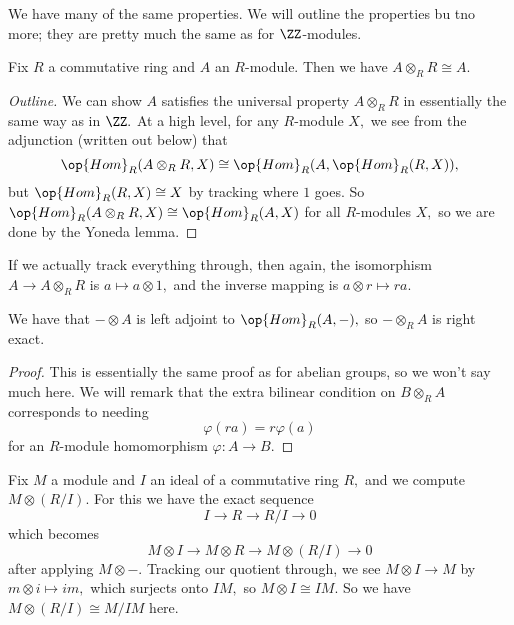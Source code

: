 \documentclass[../notes.tex]{subfiles}
\begin{document}
We have many of the same properties. We will outline the properties bu tno more; they are pretty much the same as for $\ZZ$-modules.
\begin{proposition}
	Fix $R$ a commutative ring and $A$ an $R$-module. Then we have $A\otimes_R R\cong A.$
\end{proposition}
\begin{proof}[Outline]
	We can show $A$ satisfies the universal property $A\otimes_RR$ in essentially the same way as in $\ZZ.$ At a high level, for any $R$-module $X,$ we see from the adjunction (written out below) that
	\[\op{Hom}_R(A\otimes_RR,X)\cong\op{Hom}_R(A,\op{Hom}_R(R,X)),\]
	but $\op{Hom}_R(R,X)\cong X$ by tracking where $1$ goes. So $\op{Hom}_R(A\otimes_RR,X)\cong\op{Hom}_R(A,X)$ for all $R$-modules $X,$ so we are done by the Yoneda lemma.
\end{proof}
If we actually track everything through, then again, the isomorphism $A\to A\otimes_RR$ is $a\mapsto a\otimes1,$ and the inverse mapping is $a\otimes r\mapsto ra.$
\begin{proposition}
	We have that $-\otimes A$ is left adjoint to $\op{Hom}_R(A,-),$ so $-\otimes_RA$ is right exact.
\end{proposition}
\begin{proof}
	This is essentially the same proof as for abelian groups, so we won't say much here. We will remark that the extra bilinear condition on $B\otimes_RA$ corresponds to needing
	\[\varphi(ra)=r\varphi(a)\]
	for an $R$-module homomorphism $\varphi:A\to B.$
\end{proof}
\begin{example}
	Fix $M$ a module and $I$ an ideal of a commutative ring $R,$ and we compute $M\otimes(R/I).$ For this we have the exact sequence
	\[I\to R\to R/I\to 0\]
	which becomes
	\[M\otimes I\to M\otimes R\to M\otimes(R/I)\to0\]
	after applying $M\otimes-.$ Tracking our quotient through, we see $M\otimes I\to M$ by $m\otimes i\mapsto im,$ which surjects onto $IM,$ so $M\otimes I\cong IM.$ So we have $M\otimes(R/I)\cong M/IM$ here.
\end{example}
\end{document}
